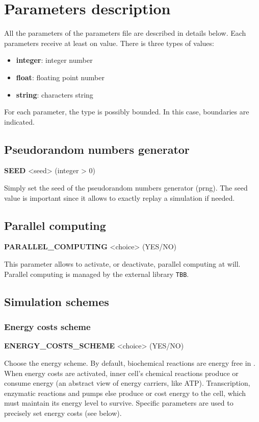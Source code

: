 \chapter{Parameters description}

All the parameters of the parameters file are described in details below. Each parameters receive at least on value. There is three types of values:
\begin{itemize}
	\item {\bf integer}: integer number
	\item {\bf float}: floating point number
	\item {\bf string}: characters string
\end{itemize}
For each parameter, the type is possibly bounded. In this case, boundaries are indicated.


\section{Pseudorandom numbers generator}

\begin{center}
{\bf SEED} <seed> (integer > 0)
\end{center}
Simply set the seed of the pseudorandom numbers generator (prng). The seed value is important since it allows to exactly replay a simulation if needed. 


\section{Parallel computing}

\begin{center}
{\bf PARALLEL\_COMPUTING} <choice> (YES/NO)
\end{center}
This parameter allows to activate, or deactivate, parallel computing at will. Parallel computing is managed by the external library \texttt{TBB}.


\section{Simulation schemes}

\subsection{Energy costs scheme}
\begin{center}
{\bf ENERGY\_COSTS\_SCHEME} <choice> (YES/NO)
\end{center}
Choose the energy scheme. By default, biochemical reactions are energy free in {\packageName}. When energy costs are activated, inner cell's chemical reactions produce or consume energy (an abstract view of energy carriers, like ATP). Transcription, enzymatic reactions and pumps else produce or cost energy to the cell, which must maintain its energy level to survive. Specific parameters are used to precisely set energy costs (see below).

